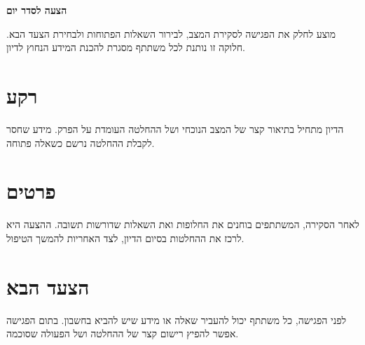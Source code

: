 \def\lakitlanguageprofile{hebrew}
\def\lakitmainlanguage{hebrew}
\def\lakitdocumentclass{article}
\def\lakitclassoptions{11pt,a4paper}
\def\lakitgeometryoptions{margin=2.2cm,headheight=14pt}
\def\lakitlinespread{1.18}
\def\lakitparagraphstyle{block}




{\LARGE\sffamily\bfseries\noindent הצעה לסדר יום\par}\medskip
מוצע לחלק את הפגישה לסקירת המצב, לבירור השאלות הפתוחות ולבחירת הצעד הבא.
חלוקה זו נותנת לכל משתתף מסגרת להכנת המידע הנחוץ לדיון.
\section{רקע}
הדיון מתחיל בתיאור קצר של המצב הנוכחי ושל ההחלטה העומדת על הפרק.
מידע שחסר לקבלת ההחלטה נרשם כשאלה פתוחה.
\section{פרטים}
לאחר הסקירה, המשתתפים בוחנים את החלופות ואת השאלות שדורשות תשובה.
ההצעה היא לרכז את ההחלטות בסיום הדיון, לצד האחריות להמשך הטיפול.
\section{הצעד הבא}
לפני הפגישה, כל משתתף יכול להעביר שאלה או מידע שיש להביא בחשבון.
בתום הפגישה אפשר להפיץ רישום קצר של ההחלטה ושל הפעולה שסוכמה.

